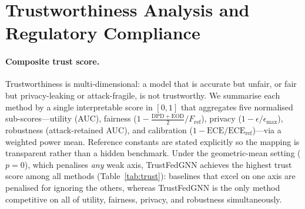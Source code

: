 \documentclass[pdflatex,sn-mathphys-num]{sn-jnl}
\theoremstyle{thmstyleone}%
\theoremstyle{thmstyletwo}%
\theoremstyle{thmstylethree}%
\newcommand{\dpd}{\mathrm{DPD}}
\newcommand{\eod}{\mathrm{EOD}}
\begin{document}
\begin{table}[t]\centering\small
\caption{Million-node scaling study (ogbn-products, $2.4$M nodes, $123$M
edges, $K{=}3$ clients, $15$ rounds, CPU). $^{\ast}$2026 baseline.
$^{\dagger}$DPD/EOD is a spurious artefact of a collapsed (near-chance)
classifier, not a genuine fairness result---see discussion above.}
\label{tab:large-scale}

\end{table}

\begin{table}[t]\centering\small
\caption{Calibration, uncertainty, and efficiency (Bail). ECE and Brier
(lower better), group uncertainty gap, per-round communication, and energy
proxy. TrustFedGNN matches FedAvg's communication footprint.}
\label{tab:efficiency}

\end{table}

\section{Trustworthiness Analysis and Regulatory Compliance}
\label{sec:trust}

\paragraph{Composite trust score.}
Trustworthiness is multi-dimensional: a model that is accurate but unfair, or
fair but privacy-leaking or attack-fragile, is not trustworthy. We summarise
each method by a single interpretable score in $[0,1]$ that aggregates five
normalised sub-scores---utility (AUC), fairness ($1-\tfrac{\dpd+\eod}{2}/F_{\text{ref}}$),
privacy ($1-\epsilon/\epsilon_{\max}$), robustness (attack-retained AUC), and
calibration ($1-\mathrm{ECE}/\mathrm{ECE}_{\text{ref}}$)---via a weighted power
mean. Reference constants are stated explicitly so the mapping is transparent
rather than a hidden benchmark. Under the geometric-mean setting ($p{=}0$),
which penalises \emph{any} weak axis, TrustFedGNN achieves the highest trust
score among all methods (Table~\ref{tab:trust}): baselines that excel on one
axis are penalised for ignoring the others, whereas TrustFedGNN is the only
method competitive on all of utility, fairness, privacy, and robustness
simultaneously.

\begin{table}[t]\centering\small
\caption{Composite trust score (Bail): utility, fairness, and privacy combined
via a weighted power mean. Only TrustFedGNN scores on all axes; best in bold.}
\label{tab:trust}

\end{table}
\end{document}
